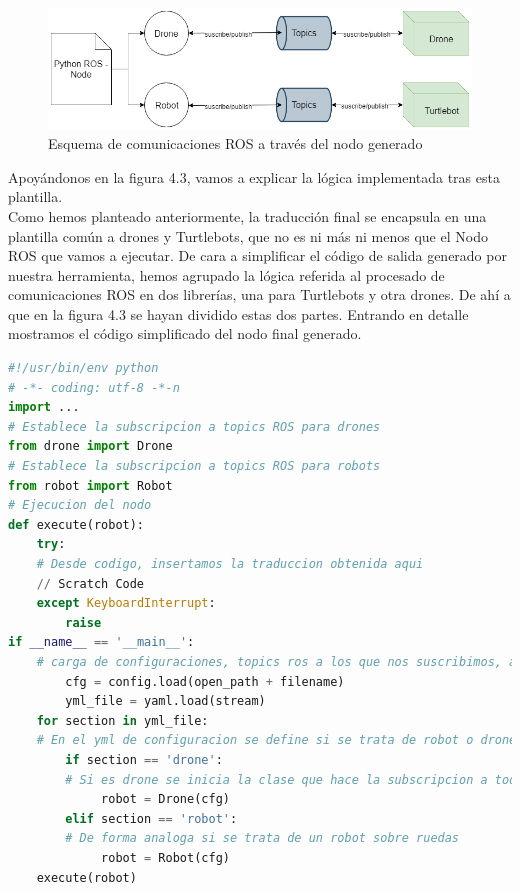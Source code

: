 \begin{figure}[H]
    \centering
    \includegraphics[scale=0.6]{img/s4r-diagrama-robot.png}
  	\caption{Esquema de comunicaciones ROS a través del nodo generado}
  	\label{fig:s4r-esquema}
\end{figure}

Apoyándonos en la figura 4.3, vamos a explicar la lógica implementada tras esta plantilla.\\

Como hemos planteado anteriormente, la traducción final se encapsula en una plantilla común a drones y Turtlebots, que no es ni más ni menos que el Nodo ROS que vamos a ejecutar. De cara a simplificar el código de salida generado por nuestra herramienta, hemos agrupado la lógica referida al procesado de comunicaciones ROS en dos librerías, una para Turtlebots y otra drones. De ahí a que en la figura 4.3 se hayan dividido estas dos partes. Entrando en detalle mostramos el código simplificado del nodo final generado.\\

\begin{lstlisting}[language=python,firstnumber=1]
#!/usr/bin/env python
# -*- coding: utf-8 -*-n
import ...
# Establece la subscripcion a topics ROS para drones
from drone import Drone 
# Establece la subscripcion a topics ROS para robots
from robot import Robot 
# Ejecucion del nodo  
def execute(robot):
    try:
    # Desde codigo, insertamos la traduccion obtenida aqui 
    // Scratch Code
    except KeyboardInterrupt:
        raise       
if __name__ == '__main__':
    # carga de configuraciones, topics ros a los que nos suscribimos, a traves de fichero yml
        cfg = config.load(open_path + filename)
        yml_file = yaml.load(stream) 
    for section in yml_file:
    # En el yml de configuracion se define si se trata de robot o drone.
        if section == 'drone':
        # Si es drone se inicia la clase que hace la subscripcion a todos los topics ROS
             robot = Drone(cfg)
        elif section == 'robot':
    	# De forma analoga si se trata de un robot sobre ruedas
             robot = Robot(cfg)
    execute(robot)

\end{lstlisting}

